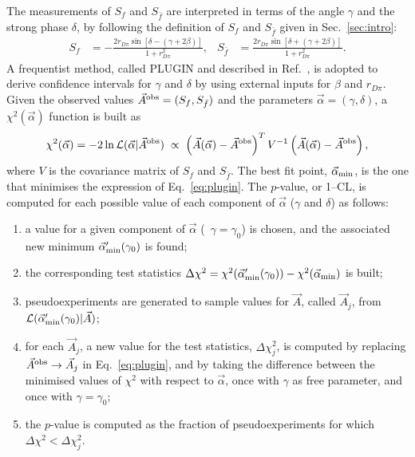 The measurements of $S_{f}$ and $S_{\bar f}$ are interpreted in terms of the angle
$\gamma$ and the strong phase $\delta$, by 
following the definition of $S_{f}$ and $S_{\bar f}$ given in Sec.~\ref{sec:intro}:
\begin{align}
  \label{eq:cpcoeff_theory}
  S_{f}&=-\frac{2r_{D\pi}\sin[\delta-(\gamma+2\beta)]}{1+r_{D\pi}^{2}}, & S_{\bar f}&=\frac{2r_{D\pi}\sin[\delta+(\gamma+2\beta)]}{1+r_{D\pi}^{2}}.
\end{align}
A frequentist method, called PLUGIN and described in Ref.~\cite{Aaij:2016kjh}, is adopted to derive confidence intervals for $\gamma$ and $\delta$
by using external inputs for $\beta$ and $r_{D\pi}$.
Given the observed values $\vec{A}^{\rm obs}=(S_{f}, S_{\bar f})$ and the parameters $\vec{\alpha}=(\gamma,\delta)$, a $\chi^2(\vec{\alpha})$ function
is built as
\begin{equation}
  \label{eq:plugin}
  \chi^2(\vec{\alpha}) = -2\ln\mathcal L(\vec{\alpha}|\vec{A}^{\rm obs}) \hspace{1mm}\propto\hspace{1mm} \left(\vec{A}(\vec{\alpha})-\vec{A}^{\rm obs}\right)^T V^{-1} \left(\vec{A}(\vec{\alpha})-\vec{A}^{\rm obs}\right), 
\end{equation}
where $V$ is the covariance matrix of $S_{f}$ and $S_{\bar f}$. 
The best fit point, $\vec{\alpha}_{\rm min}$, is the one that minimises the expression of Eq.~\ref{eq:plugin}. 
The $p$-value, or 1--CL, is computed for each possible value of each component of $\vec{\alpha}$ ($\gamma$ and $\delta$) as follows:
\begin{enumerate}[noitemsep,topsep=0pt]
  \item a value for a given component of $\vec{\alpha}$ (\eg~$\gamma=\gamma_0$) is chosen, and the associated new minimum $\vec{\alpha}'_{\rm min}(\gamma_0)$ is found;
  \item the corresponding test statistics $\Delta\chi^2=\chi^2(\vec{\alpha}'_{\rm min}(\gamma_0))-\chi^2(\vec{\alpha}_{\rm min})$ is built;
    \item pseudoexperiments are generated to sample values for $\vec{A}$, called $\vec{A}_j$, from $\mathcal L(\vec{\alpha}'_{\rm min}(\gamma_0)|\vec{A})$;
      \item for each $\vec{A}_j$, a new value for the test statistics, $\Delta\chi^2_j$, is computed by replacing $\vec{A}^{\rm obs}\to\vec{A}_j$ 
        in Eq.~\ref{eq:plugin}, and
        by taking the difference between the minimised values of $\chi^2$ with respect to $\vec{\alpha}$, once with $\gamma$ as free
        parameter, and once with $\gamma=\gamma_0$;
        \item the $p$-value is computed as the fraction of pseudoexperiments for which $\Delta\chi^2<\Delta\chi^2_j$.
\end{enumerate}
